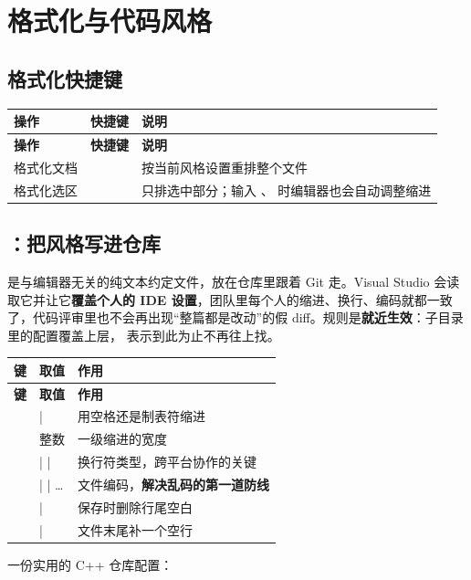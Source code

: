 \section{格式化与代码风格}
\subsection{格式化快捷键}

\begin{longtable}{L{3.0cm}L{4.6cm}L{7.0cm}}\toprule
\textbf{操作} & \textbf{快捷键} & \textbf{说明} \\ \midrule \endfirsthead
\toprule \textbf{操作} & \textbf{快捷键} & \textbf{说明} \\ \midrule \endhead \bottomrule \endlastfoot
格式化文档 &  & 按当前风格设置重排整个文件 \\
格式化选区 &  & 只排选中部分；输入 \code{;}、\codeP{\}} 时编辑器也会自动调整缩进 \\
\end{longtable}
\subsection{：把风格写进仓库}

 是与编辑器无关的纯文本约定文件，放在仓库里跟着 Git 走。Visual Studio 会读取它并让它\textbf{覆盖个人的 IDE 设置}，团队里每个人的缩进、换行、编码就都一致了，代码评审里也不会再出现“整篇都是改动”的假 diff。规则是\textbf{就近生效}：子目录里的配置覆盖上层， 表示到此为止不再往上找。

\begin{longtable}{L{5.8cm}L{3.6cm}L{5.2cm}}\toprule
\textbf{键} & \textbf{取值} & \textbf{作用} \\ \midrule \endfirsthead
\toprule \textbf{键} & \textbf{取值} & \textbf{作用} \\ \midrule \endhead \bottomrule \endlastfoot
{} &  |  & 用空格还是制表符缩进 \\
 & 整数 & 一级缩进的宽度 \\
 &  |  |  & 换行符类型，跨平台协作的关键 \\
 &  |  |  … & 文件编码，\textbf{解决乱码的第一道防线} \\
 &  |  & 保存时删除行尾空白 \\
 &  |  & 文件末尾补一个空行 \\
\end{longtable}
一份实用的 C++ 仓库配置：

